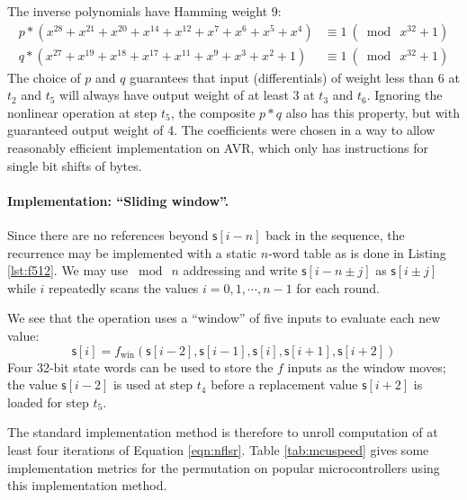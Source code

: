 \documentclass{iacrtrans}
\newcommand{\msf}[1]{\mathsf{#1}}
\begin{document}
	The inverse polynomials have Hamming weight 9:
	\begin{align}
	\label{eqn:inverse}
	p * (x^{28} + x^{21} + x^{20} + x^{14} + x^{12} + x^7 + x^6 + x^5 + x^4) 
		& \equiv 1 ~ (\bmod ~ x^{32}+1) \\
	q * (x^{27} + x^{19} + x^{18} + x^{17} + x^{11} + x^9 + x^3 + x^2 + 1)
		& \equiv 1 ~ (\bmod ~ x^{32}+1) 
	\end{align}
	The choice of $p$ and $q$ guarantees that input (differentials) of weight
	less than 6 at $t_2$ and $t_5$ will always have output weight of at 
	least 3 at $t_3$ and $t_6$. Ignoring the nonlinear
	operation at step $t_5$, the composite $p * q$ also has this
	property, but with guaranteed output weight of 4. The coefficients were 
	chosen in a way to allow reasonably efficient implementation on AVR, 
	which only has instructions for single bit shifts of bytes.

	\paragraph{Implementation: ``Sliding window''.}
	Since there are no references beyond $\msf{s}[i-n]$ back in the sequence, 
	the recurrence may be implemented with a static $n$-word table as is
	done in Listing \ref{lst:f512}.
	We may use $\bmod ~ n$ addressing and write $\msf{s}[i - n \pm j]$ as 
	$\msf{s}[i \pm j]$ while $i$ repeatedly scans the values $i = 0, 1, \cdots, 
	n-1$ for each round.

	We see that the operation uses a ``window'' of five inputs to evaluate
	each new value:
	\begin{equation}
		\label{eqn:window}
		\msf{s}[i] = f_{\text{win}}(\msf{s}[i - 2], \msf{s}[i - 1], 
		\msf{s}[i], \msf{s}[i + 1], \msf{s}[i + 2])
	\end{equation}
	Four 32-bit state words can be used to store the $f$ inputs as the
	window moves; the value $\msf{s}[i - 2]$ is used at step 
	$t_4$ before a replacement value $\msf{s}[i + 2]$ is loaded for 
	step $t_5$. 

	The standard implementation method is therefore to unroll
	computation of at least four iterations of Equation \ref{eqn:nflsr}. 
	Table \ref{tab:mcuspeed} gives some implementation metrics for the
	permutation on popular microcontrollers using this implementation method.
\end{document}
